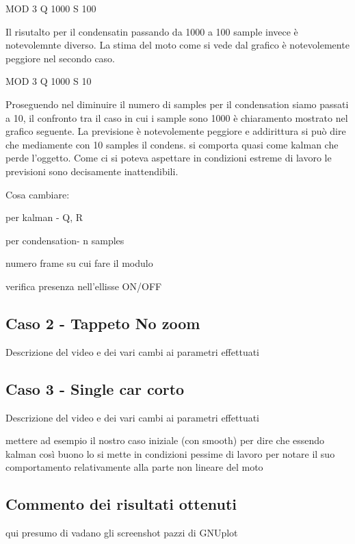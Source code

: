 MOD 3 Q 1000 S 100

Il risutalto  per il condensatin passando da 1000 a 100 sample invece è notevolemnte diverso. La stima del moto come si vede dal grafico è notevolemente peggiore nel secondo caso.


MOD 3 Q 1000 S 10

Proseguendo nel diminuire il numero di samples per il condensation siamo passati a 10, il confronto tra il caso in cui i sample sono 1000 è chiaramento mostrato nel grafico seguente. La previsione è notevolemente peggiore e addirittura si può dire che mediamente con 10 samples il condens. si comporta quasi come kalman  che perde l'oggetto. Come ci si poteva aspettare in condizioni estreme di lavoro le previsioni sono decisamente inattendibili.

Cosa cambiare: 

per kalman - Q, R

per condensation- n samples

numero frame su cui fare il modulo

verifica presenza nell'ellisse ON/OFF


\subsection{Caso 2 - Tappeto No zoom}
Descrizione del video e dei vari cambi ai parametri effettuati
\subsection{Caso 3 - Single car corto}
Descrizione del video e dei vari cambi ai parametri effettuati

mettere ad esempio il nostro caso iniziale (con smooth) per dire che essendo kalman così buono lo si mette in condizioni pessime di lavoro per notare il suo comportamento relativamente alla parte non lineare del moto
\subsection{Commento dei risultati ottenuti}
qui presumo di vadano gli screenshot pazzi di GNUplot

